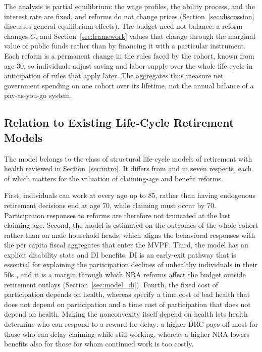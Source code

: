 The analysis is partial equilibrium: the wage profiles, the ability process, and the interest rate are fixed, and reforms do not change prices (Section~\ref{sec:discussion} discusses general-equilibrium effects). The budget need not balance: a reform changes $G$, and Section~\ref{sec:framework} values that change through the marginal value of public funds rather than by financing it with a particular instrument. Each reform is a permanent change in the rules faced by the cohort, known from age 30, so individuals adjust saving and labor supply over the whole life cycle in anticipation of rules that apply later. The aggregates thus measure net government spending on one cohort over its lifetime, not the annual balance of a pay-as-you-go system.

\subsection{Relation to Existing Life-Cycle Retirement Models}\label{sec:model_relation}

The model belongs to the class of structural life-cycle models of retirement with health reviewed in Section~\ref{sec:intro}. It differs from \citet{french2005effects} and \citet{french2011effects} in seven respects, each of which matters for the valuation of claiming-age and benefit reforms.

First, individuals can work at every age up to 85, rather than having endogenous retirement decisions end at age 70, while claiming must occur by 70. Participation responses to reforms are therefore not truncated at the last claiming age. Second, the model is estimated on the outcomes of the whole cohort rather than on male household heads, which aligns the behavioral responses with the per capita fiscal aggregates that enter the MVPF. Third, the model has an explicit disability state and DI benefits. DI is an early-exit pathway that is essential for explaining the participation declines of unhealthy individuals in their 50s \citep{Yu2024}, and it is a margin through which NRA reforms affect the budget outside retirement outlays (Section~\ref{sec:model_di}). Fourth, the fixed cost of participation depends on health, whereas \citet{french2011effects} specify a time cost of bad health that does not depend on participation and a time cost of participation that does not depend on health. Making the nonconvexity itself depend on health lets health determine who can respond to a reward for delay: a higher DRC pays off most for those who can delay claiming while still working, whereas a higher NRA lowers benefits also for those for whom continued work is too costly.

